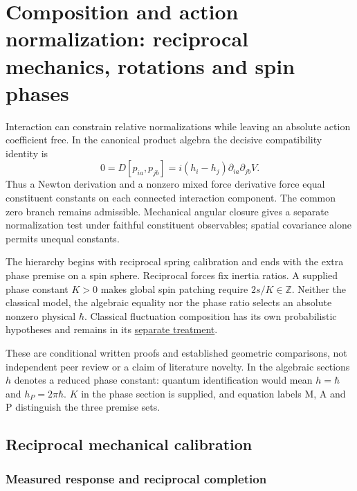 \documentclass[11pt,a4paper]{article}
\begin{document}
\hypertarget{composition-and-action-normalization-reciprocal-mechanics-rotations-and-spin-phases}{%
\section{Composition and action normalization: reciprocal mechanics,
rotations and spin
phases}\label{composition-and-action-normalization-reciprocal-mechanics-rotations-and-spin-phases}}

Interaction can constrain relative normalizations while leaving an
absolute action coefficient free. In the canonical product algebra the
decisive compatibility identity is
\[0=D[p_{ia},p_{jb}]=i(h_i-h_j)\partial_{ia}\partial_{jb}V.\] Thus a
Newton derivation and a nonzero mixed force derivative force equal
constituent constants on each connected interaction component. The
common zero branch remains admissible. Mechanical angular closure gives
a separate normalization test under faithful constituent observables;
spatial covariance alone permits unequal constants.

The hierarchy begins with reciprocal spring calibration and ends with
the extra phase premise on a spin sphere. Reciprocal forces fix inertia
ratios. A supplied phase constant \(K>0\) makes global spin patching
require \(2s/K\in\mathbb Z\). Neither the classical model, the algebraic
equality nor the phase ratio selects an absolute nonzero physical
\(\hbar\). Classical fluctuation composition has its own probabilistic
hypotheses and remains in its
\href{composition-universality.md}{separate treatment}.

These are conditional written proofs and established geometric
comparisons, not independent peer review or a claim of literature
novelty. In the algebraic sections \(h\) denotes a reduced phase
constant: quantum identification would mean \(h=\hbar\) and
\(h_P=2\pi\hbar\). \(K\) in the phase section is supplied, and equation
labels M, A and P distinguish the three premise sets.

\hypertarget{reciprocal-mechanical-calibration}{%
\subsection{Reciprocal mechanical
calibration}\label{reciprocal-mechanical-calibration}}

\hypertarget{measured-response-and-reciprocal-completion}{%
\subsubsection{Measured response and reciprocal
completion}\label{measured-response-and-reciprocal-completion}}
\end{document}
